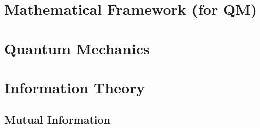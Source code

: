 

\section{Mathematical Framework (for QM)}
	
\section{Quantum Mechanics}
	
\section{Information Theory}
	
	\subsection{Mutual Information}
